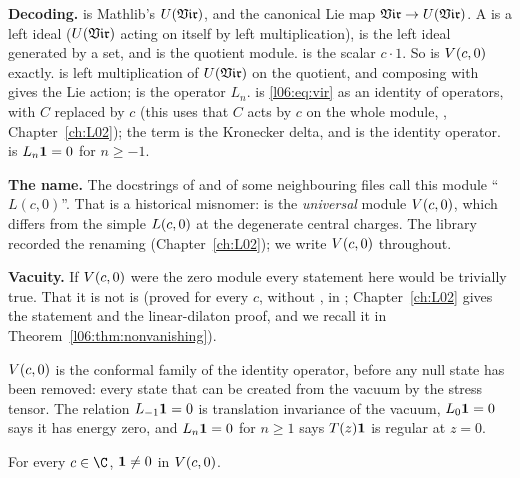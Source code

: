 \begin{dictionary}
\textbf{Decoding.}  is Mathlib's $U(\mathfrak{Vir})$, and 
the canonical Lie map $\mathfrak{Vir}\to U(\mathfrak{Vir})$. A  is a left ideal ($U(\mathfrak{Vir})$
acting on itself by left multiplication),  is the left ideal generated by a set,
and  is the quotient module.  is the scalar $c\cdot1$. So
 is $V(c,0)$ exactly.  is left multiplication of $U(\mathfrak{Vir})$ on the
quotient, and composing with  gives the Lie action;  is the operator $L_n$.
 is \eqref{l06:eq:vir} as an identity of operators, with $C$ replaced by $c$ (this
uses that $C$ acts by $c$ on the whole module, , Chapter~\ref{ch:L02}); the term
 is the Kronecker delta, and  is the
identity operator.  is $L_n\mathbf{1} = 0$ for $n\ge-1$.

\textbf{The name.} The docstrings of  and of some neighbouring files call
this module ``$L(c,0)$''. That is a historical misnomer:  is the \emph{universal}
module $V(c,0)$, which differs from the simple $L(c,0)$ at the degenerate central charges. The
library recorded the renaming (Chapter~\ref{ch:L02}); we write $V(c,0)$ throughout.

\textbf{Vacuity.} If $V(c,0)$ were the zero module every statement here would be trivially true. That
it is not is  (proved for every $c$, without ,
in ; Chapter~\ref{ch:L02} gives the statement and the
linear-dilaton proof, and we recall it in Theorem~\ref{l06:thm:nonvanishing}).
\end{dictionary}

\begin{physics}
$V(c,0)$ is the conformal family of the identity operator, before any null state has been removed:
every state that can be created from the vacuum by the stress tensor. The relation $L_{-1}\mathbf{1} = 0$
is translation invariance of the vacuum, $L_0\mathbf{1} = 0$ says it has energy zero, and $L_n\mathbf{1} = 0$
for $n\ge1$ says $T(z)\mathbf{1}$ is regular at $z = 0$.
\end{physics}

\begin{theorem}\label{l06:thm:nonvanishing}
For every $c\in\C$, $\mathbf{1}\ne0$ in $V(c,0)$.
\end{theorem}

